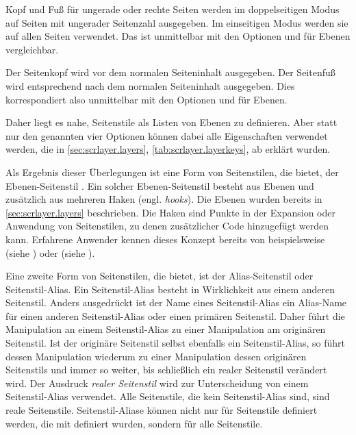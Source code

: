 Kopf und Fuß für ungerade oder rechte Seiten werden im doppelseitigen Modus auf Seiten mit ungerader Seitenzahl
ausgegeben. Im einseitigen Modus werden sie auf allen Seiten verwendet. Das
ist unmittelbar mit den
Optionen 
und  für Ebenen vergleichbar.

Der Seitenkopf wird vor dem normalen Seiteninhalt
ausgegeben. Der Seitenfuß wird entsprechend nach dem normalen Seiteninhalt
ausgegeben. Dies korrespondiert also unmittelbar mit den
Optionen
 und  für Ebenen.

Daher liegt es nahe, Seitenstile als Listen von Ebenen zu definieren. Aber
statt nur den genannten vier Optionen können dabei alle Eigenschaften
verwendet werden, die in \autoref{sec:scrlayer.layers},
\autoref{tab:scrlayer.layerkeys}, ab 
erklärt wurden.

Als Ergebnis dieser Überlegungen ist eine Form von Seitenstilen, die
 bietet, der Ebenen-Seitenstil%
. Ein
solcher Ebenen-Seitenstil besteht aus Ebenen und zusätzlich aus mehreren Haken
(engl. \emph{hooks}). Die Ebenen wurden bereits in
\autoref{sec:scrlayer.layers} beschrieben. Die
Haken sind Punkte in der Expansion
oder Anwendung von Seitenstilen, zu denen zusätzlicher Code hinzugefügt werden
kann. Erfahrene Anwender kennen dieses Konzept bereits von beispielsweise
 (siehe \cite{latex:usrguide}) oder
 (siehe
).

Eine zweite Form von Seitenstilen, die  bietet, ist der
Alias-Seitenstil%
 oder
Seitenstil-Alias. Ein Seitenstil-Alias besteht in Wirklichkeit aus einem
anderen Seitenstil. Anders ausgedrückt ist der Name eines Seitenstil-Alias ein
Alias-Name für einen anderen Seitenstil-Alias oder einen primären
Seitenstil. Daher führt die Manipulation an einem Seitenstil-Alias zu einer
Manipulation am originären Seitenstil. Ist der originäre Seitenstil selbst
ebenfalls ein Seitenstil-Alias, so führt dessen Manipulation wiederum zu einer
Manipulation dessen originären Seitenstils und immer so weiter, bis
schließlich ein realer Seitenstil verändert wird. Der Ausdruck \emph{realer
  Seitenstil} wird zur Unterscheidung von einem
Seitenstil-Alias verwendet. Alle Seitenstile, die kein Seitenstil-Alias sind,
sind reale Seitenstile. Seitenstil-Aliase können nicht nur für Seitenstile
definiert werden, die mit  definiert wurden, sondern für
alle Seitenstile.


